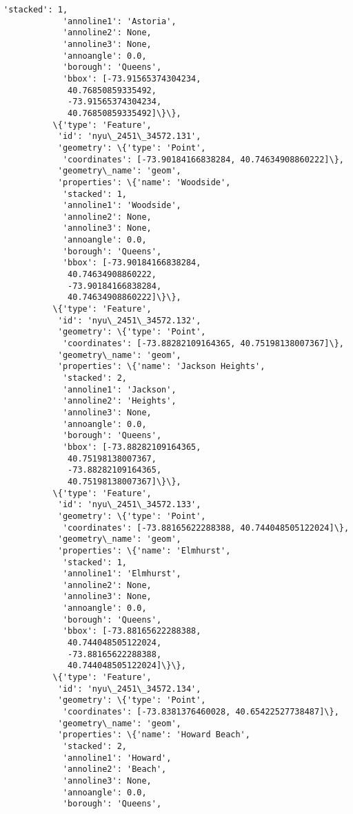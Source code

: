 \documentclass[11pt]{article}
\begin{document}
\begin{Verbatim}[commandchars=\\\{\}]
            'stacked': 1,
            'annoline1': 'Astoria',
            'annoline2': None,
            'annoline3': None,
            'annoangle': 0.0,
            'borough': 'Queens',
            'bbox': [-73.91565374304234,
             40.76850859335492,
             -73.91565374304234,
             40.76850859335492]\}\},
          \{'type': 'Feature',
           'id': 'nyu\_2451\_34572.131',
           'geometry': \{'type': 'Point',
            'coordinates': [-73.90184166838284, 40.74634908860222]\},
           'geometry\_name': 'geom',
           'properties': \{'name': 'Woodside',
            'stacked': 1,
            'annoline1': 'Woodside',
            'annoline2': None,
            'annoline3': None,
            'annoangle': 0.0,
            'borough': 'Queens',
            'bbox': [-73.90184166838284,
             40.74634908860222,
             -73.90184166838284,
             40.74634908860222]\}\},
          \{'type': 'Feature',
           'id': 'nyu\_2451\_34572.132',
           'geometry': \{'type': 'Point',
            'coordinates': [-73.88282109164365, 40.75198138007367]\},
           'geometry\_name': 'geom',
           'properties': \{'name': 'Jackson Heights',
            'stacked': 2,
            'annoline1': 'Jackson',
            'annoline2': 'Heights',
            'annoline3': None,
            'annoangle': 0.0,
            'borough': 'Queens',
            'bbox': [-73.88282109164365,
             40.75198138007367,
             -73.88282109164365,
             40.75198138007367]\}\},
          \{'type': 'Feature',
           'id': 'nyu\_2451\_34572.133',
           'geometry': \{'type': 'Point',
            'coordinates': [-73.88165622288388, 40.744048505122024]\},
           'geometry\_name': 'geom',
           'properties': \{'name': 'Elmhurst',
            'stacked': 1,
            'annoline1': 'Elmhurst',
            'annoline2': None,
            'annoline3': None,
            'annoangle': 0.0,
            'borough': 'Queens',
            'bbox': [-73.88165622288388,
             40.744048505122024,
             -73.88165622288388,
             40.744048505122024]\}\},
          \{'type': 'Feature',
           'id': 'nyu\_2451\_34572.134',
           'geometry': \{'type': 'Point',
            'coordinates': [-73.8381376460028, 40.65422527738487]\},
           'geometry\_name': 'geom',
           'properties': \{'name': 'Howard Beach',
            'stacked': 2,
            'annoline1': 'Howard',
            'annoline2': 'Beach',
            'annoline3': None,
            'annoangle': 0.0,
            'borough': 'Queens',

\end{Verbatim}
\end{document}
